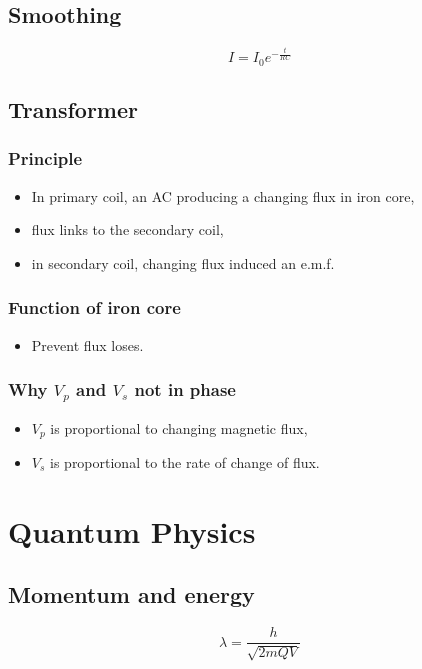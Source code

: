 \documentclass[a4paper,9pt]{scrartcl}
\begin{document}
    \subsection{Smoothing}

    \begin{displaymath}
        I = {I_0}e^{-\frac{t}{RC}}
    \end{displaymath}

    \subsection{Transformer}

    \subsubsection{Principle}
    \begin{itemize}
        \item In primary coil, an AC producing a changing flux in iron core,
        \item flux links to the secondary coil,
        \item in secondary coil, changing flux induced an e.m.f.
    \end{itemize}

    \subsubsection{Function of iron core}
    \begin{itemize}
        \item Prevent flux loses.
    \end{itemize}

    \subsubsection{Why $V_p$ and $V_s$ not in phase}
    \begin{itemize}
        \item $V_p$ is proportional to changing magnetic flux,
        \item $V_s$ is proportional to the rate of change of flux.
    \end{itemize}


    \section{Quantum Physics}

    \subsection{Momentum and energy}
    \begin{displaymath}
        \lambda = \frac{h}{\sqrt{2mQV}}
    \end{displaymath}
\end{document}
